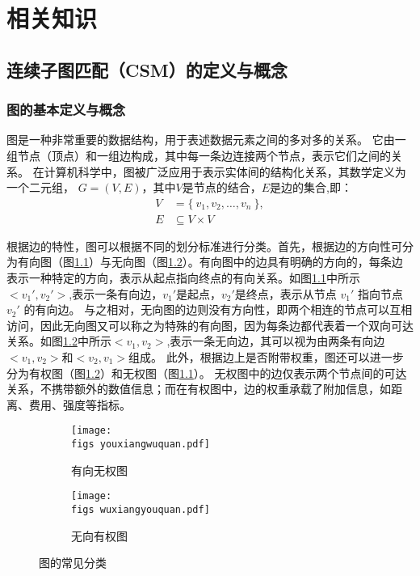 \chapter{相关知识}

\section{连续子图匹配（CSM）的定义与概念}
\subsection{图的基本定义与概念}
图是一种非常重要的数据结构，用于表述数据元素之间的多对多的关系。
它由一组节点（顶点）和一组边构成，其中每一条边连接两个节点，表示它们之间的关系。
在计算机科学中，图被广泛应用于表示实体间的结构化关系，其数学定义为一个二元组，
$G=(V,E)$，其中$V$是节点的结合，$E$是边的集合,即：
\begin{align*}
  V &= \{\ v_1, v_2, \dots, v_n\ \},\\
  E &\subseteq V \times V
\end{align*}

根据边的特性，图可以根据不同的划分标准进行分类。首先，根据边的方向性可分为有向图（图\ref{fig:example_noweight}）与无向图（图\ref{fig:example_weight}）。有向图中的边具有明确的方向的，每条边表示一种特定的方向，表示从起点指向终点的有向关系。如图\ref{fig:example_noweight}中所示$<v_1',v_2'>$,表示一条有向边，$v_1'$是起点，$v_2'$是终点，表示从节点 $v_1'$ 指向节点 $v_2'$ 的有向边。
与之相对，无向图的边则没有方向性，即两个相连的节点可以互相访问，因此无向图又可以称之为特殊的有向图，因为每条边都代表着一个双向可达关系。如图\ref{fig:example_weight}中所示$<v_1,v_2>$,表示一条无向边，其可以视为由两条有向边$<v_1,v_2>$和$<v_2,v_1>$组成。
此外，根据边上是否附带权重，图还可以进一步分为有权图（图\ref{fig:example_weight}）和无权图（图\ref{fig:example_noweight}）。
无权图中的边仅表示两个节点间的可达关系，不携带额外的数值信息；而在有权图中，边的权重承载了附加信息，如距离、费用、强度等指标。

\begin{figure}[h!]
    \def\wscorevone{0.48}
    \centering
        \begin{subfigure}[t]{\wscorevone\linewidth}
            \centering
            \resizebox{\linewidth}{!}
            {
                \texttt{[image: \\figs youxiangwuquan.pdf]}
            }
            \caption{有向无权图}
            \label{fig:example_noweight}
        \end{subfigure}
        \hfill
        \begin{subfigure}[t]{\wscorevone\linewidth}
            \centering
            \resizebox{\linewidth}{!}
            {
                \texttt{[image: \\figs wuxiangyouquan.pdf]}
            }
            \caption{无向有权图}
            \label{fig:example_weight}
        \end{subfigure}
        \label{fig:definition}
        \caption{图的常见分类}
    \end{figure}

